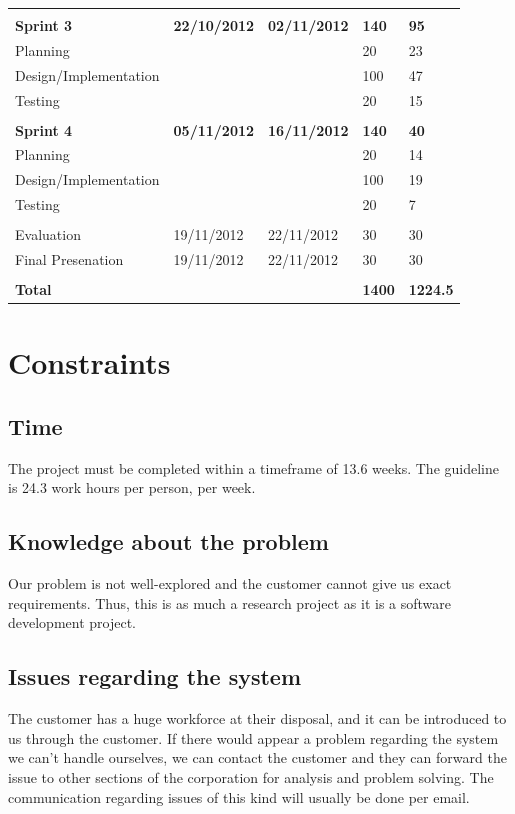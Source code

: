 \begin{table}
\begin{tabular}{ l l l l l }
\hline \\ [-2.0ex]
 \bf{Sprint 3}			&\bf{22/10/2012}	&\bf{02/11/2012}	&\bf{140}		&\bf{95}		\\
 Planning				&				&				&20			&23		\\
 Design/Implementation	&				&				&100		&47		\\
 Testing				&				&				&20			&15		\\
\hline \\ [-2.0ex]
 \bf{Sprint 4}			&\bf{05/11/2012}	&\bf{16/11/2012}	&\bf{140}		&\bf{40}		\\
 Planning				&				&				&20			&14		\\
 Design/Implementation	&				&				&100		&19		\\
 Testing				&				&				&20			&7		\\
\hline \\ [-2.0ex]
 Evaluation			&19/11/2012		&22/11/2012		&30			&30		\\
 Final Presenation		&19/11/2012		&22/11/2012		&30			&30		\\
\hline \\ [-2.0ex]
 \bf{Total}			&				&				&\bf{1400}	&\bf{1224.5}		\\
\hline
\end{tabular}
\label{table:wbs}
\end{table}


\section{Constraints}
\subsection{Time}
The project must be completed within a timeframe of 13.6 weeks. The guideline is 24.3 work hours per person, per week. 

\subsection{Knowledge about the problem}
Our problem is not well-explored and the customer cannot give us exact requirements. Thus, this is as much a research project as it is a software development project.

\subsection{Issues regarding  the system}
The customer has a huge workforce at their disposal, and it can be introduced to us through the customer. If there would appear a problem regarding the system we can’t handle ourselves, we can contact the customer and they can forward the issue to other sections of the corporation for analysis and problem solving. The communication regarding issues of this kind will usually be done per email. 

